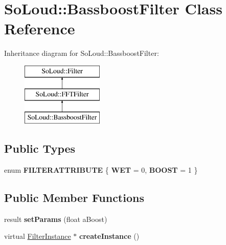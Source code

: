 \hypertarget{class_so_loud_1_1_bassboost_filter}{}\section{So\+Loud\+:\+:Bassboost\+Filter Class Reference}
\label{class_so_loud_1_1_bassboost_filter}
Inheritance diagram for So\+Loud\+:\+:Bassboost\+Filter\+:\begin{figure}[H]
\begin{center}
\leavevmode
\includegraphics[height=3.000000cm]{class_so_loud_1_1_bassboost_filter}
\end{center}
\end{figure}
\subsection*{Public Types}
\begin{DoxyCompactItemize}
\item 
\mbox{\label{class_so_loud_1_1_bassboost_filter_a7b75a38ff566a9e470f7404aec931547}} 
enum {\bfseries F\+I\+L\+T\+E\+R\+A\+T\+T\+R\+I\+B\+U\+TE} \{ {\bfseries W\+ET} = 0, 
{\bfseries B\+O\+O\+ST} = 1
 \}
\end{DoxyCompactItemize}
\subsection*{Public Member Functions}
\begin{DoxyCompactItemize}
\item 
\mbox{\label{class_so_loud_1_1_bassboost_filter_aded072ee3842f0f8870b5e24cc6bf94d}} 
result {\bfseries set\+Params} (float a\+Boost)
\item 
\mbox{\label{class_so_loud_1_1_bassboost_filter_a8577039204f428e7fc881fd2649b5f0c}} 
virtual \mbox{\hyperlink{class_so_loud_1_1_filter_instance}{Filter\+Instance}} $\ast$ {\bfseries create\+Instance} ()
\end{DoxyCompactItemize}
